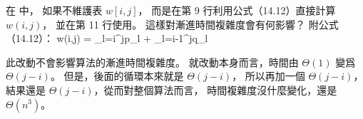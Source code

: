 \startEXERCISE
在  中，
如果不維護表 $w[i,j]$，
而是在第 9 行利用公式（14.12）直接計算 $w(i,j)$，
並在第 11 行使用。
這樣對漸進時間複雜度會有何影響？
附公式（14.12）：
\startformula
w(i,j) = \sum_{l=i}^{j}p_l + \sum_{l=i-1}^{j}q_l
\stopformula

\stopEXERCISE

\startANSWER
此改動不會影響算法的漸進時間複雜度。
就改動本身而言，時間由 $\Theta(1)$ 變爲 $\Theta(j-i)$。
但是，後面的循環本來就是 $\Theta(j-i)$，
所以再加一個 $\Theta(j-i)$，
結果還是 $\Theta(j-i)$，從而對整個算法而言，
時間複雜度沒什麼變化，還是 $\Theta(n^3)$。
\stopANSWER
